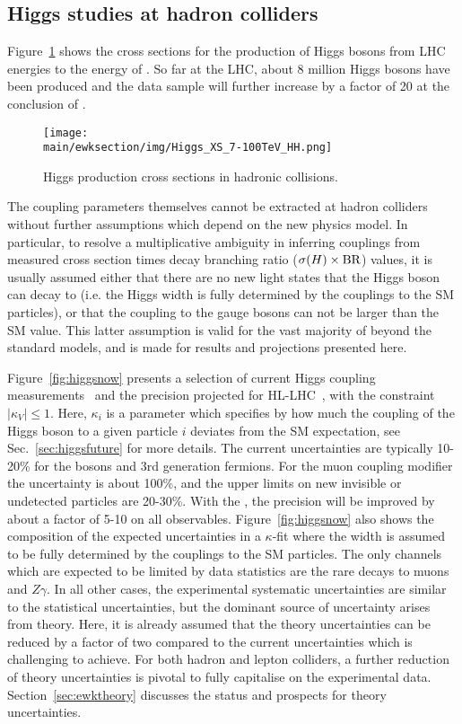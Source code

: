 \documentclass[../report.tex]{subfiles}
\providecommand{\main}{..}
\begin{document}
\subsection{Higgs studies at hadron colliders}
Figure~\ref{fig:Higgs_XS_7-100TeV_HH} shows the cross
sections for the production of Higgs bosons from LHC energies to the energy of \FCChh. 
So far at the LHC, about 8 million Higgs bosons have been produced and the data sample will further increase by a factor of 20 at the conclusion of \HLLHC.
\begin{figure}[t]
\centering
\texttt{[image: \\main/ewksection/img/Higgs\_XS\_7-100TeV\_HH.png]}
\caption{\label{fig:Higgs_XS_7-100TeV_HH}
Higgs production cross sections in hadronic collisions.}
\end{figure}
The coupling parameters themselves cannot be extracted at hadron colliders without further assumptions which depend on the new physics model. 
In particular, to resolve a multiplicative ambiguity in inferring couplings from measured cross section times decay branching ratio ($\sigma(H) \times {\rm BR}$) values, it is usually assumed either that there are no new light states that the Higgs boson can decay to (i.e. the Higgs width is fully determined by the couplings to the SM particles), or that the coupling to the gauge bosons can not be larger than the SM value.  This latter assumption is valid for the vast majority of beyond the standard models, and is made for results and projections presented here. 

Figure~\ref{fig:higgsnow} presents a selection of current Higgs coupling measurements~\cite{atlashcomb2,cmshcomb2} and the precision projected for HL-LHC~\cite{Cepeda:2019klc}, with the constraint $|\kappa_V|\leq 1$. Here, $\kappa_i$ is a parameter which specifies by how much the coupling of the Higgs boson to a given particle $i$ deviates from the SM expectation, see Sec.~\ref{sec:higgsfuture} for more details. The current uncertainties are typically 10-20\% for the bosons and 3rd generation fermions. For the muon coupling modifier the uncertainty is about 100\%, and the upper limits on new invisible or undetected particles are 20-30\%. With the \HLLHC, the precision will be improved by about a factor of 5-10 on all observables. Figure~\ref{fig:higgsnow} also shows the composition of the expected \HLLHC uncertainties in a $\kappa$-fit where the width is assumed to be fully determined by the couplings to the SM particles. The only channels which are expected to be limited by data statistics are the rare decays to muons and $Z\gamma$. In all other cases, the experimental systematic uncertainties are similar to the statistical uncertainties, but the dominant source of uncertainty arises from theory. Here, it is already assumed that the theory uncertainties can be reduced by a factor of two compared to the current uncertainties which is challenging to achieve. For both hadron and lepton colliders, a further reduction of theory uncertainties is pivotal to fully capitalise on the experimental data. Section~\ref{sec:ewktheory} discusses the status and prospects for theory uncertainties.
\end{document}
